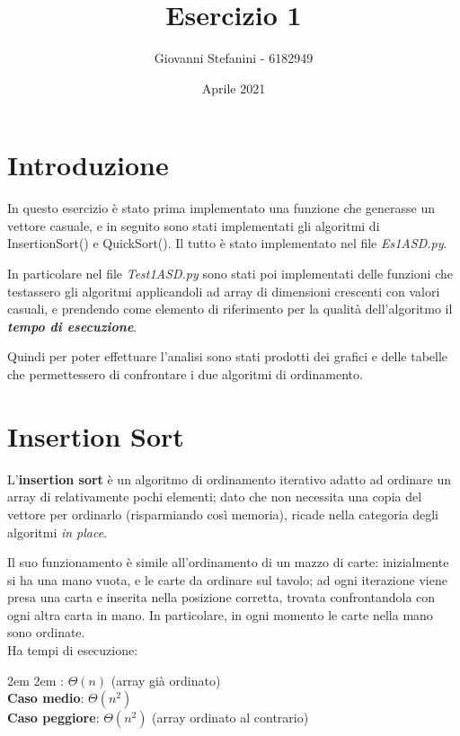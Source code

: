 \documentclass{article}
\begin{document}
\title{Esercizio 1}
\author{Giovanni Stefanini - 6182949}
\date{Aprile 2021}
\maketitle


\section{Introduzione}
In questo esercizio è stato prima implementato una funzione che generasse un vettore casuale, e in seguito sono stati implementati gli algoritmi di InsertionSort() e QuickSort(). Il tutto è stato implementato nel file {\em Es1ASD.py}.

In particolare nel file {\em Test1ASD.py} sono stati poi implementati delle funzioni che testassero gli algoritmi applicandoli ad array di dimensioni crescenti con valori casuali, e prendendo come elemento di riferimento per la qualità dell'algoritmo il {\em \bf tempo di esecuzione}.
 
Quindi per poter effettuare l'analisi sono stati prodotti dei grafici e delle tabelle che permettessero di confrontare i due algoritmi di ordinamento.

\section{Insertion Sort}
L'{\bf insertion sort} è un algoritmo di ordinamento iterativo adatto ad ordinare un array di relativamente pochi elementi; dato che non necessita una copia del vettore per ordinarlo (risparmiando così memoria), ricade nella categoria degli algoritmi {\em in place}.

Il suo funzionamento è simile all'ordinamento di un mazzo di carte: inizialmente si ha una mano vuota, e le carte da ordinare sul tavolo; ad ogni iterazione viene presa una carta e inserita nella posizione corretta, trovata confrontandola con ogni altra carta in mano. In particolare, in ogni momento le carte nella mano sono ordinate.\\

Ha tempi di esecuzione:

\begingroup
\leftskip2em \rightskip2em
: $\Theta(n)$ (array già ordinato)\\
{\bf Caso medio}: $\Theta(n^2)$\\
{\bf Caso peggiore}: $\Theta(n^2)$ (array ordinato al contrario)
\par
\endgroup
\end{document}
